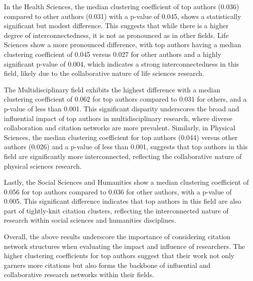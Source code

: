 In the Health Sciences, the median clustering coefficient of top authors
(0.036) compared to other authors (0.031) with a p-value of 0.045, shows a
statistically significant but modest difference. This suggests that while there
is a higher degree of interconnectedness, it is not as pronounced as in other
fields. Life Sciences show a more pronounced difference, with top authors
having a median clustering coefficient of 0.045 versus 0.027 for other authors
and a highly significant p-value of 0.004, which indicates a strong
interconnectedness in this field, likely due to the collaborative nature of
life sciences research.

The Multidisciplinary field exhibits the highest difference with a median
clustering coefficient of 0.062 for top authors compared to 0.031 for others,
and a p-value of less than 0.001. This significant disparity underscores the
broad and influential impact of top authors in multidisciplinary research,
where diverse collaboration and citation networks are more prevalent.
Similarly, in Physical Sciences, the median clustering coefficient for top
authors (0.044) versus other authors (0.026) and a p-value of less than 0.001,
suggests that top authors in this field are significantly more interconnected,
reflecting the collaborative nature of physical sciences research.

Lastly, the Social Sciences and Humanities show a median clustering coefficient
of 0.056 for top authors compared to 0.036 for other authors, with a p-value of
0.005. This significant difference indicates that top authors in this field are
also part of tightly-knit citation clusters, reflecting the interconnected
nature of research within social sciences and humanities disciplines.

Overall, the above results underscore the importance of considering citation
network structures when evaluating the impact and influence of researchers. The
higher clustering coefficients for top authors suggest that their work not only
garners more citations but also forms the backbone of influential and
collaborative research networks within their fields.

